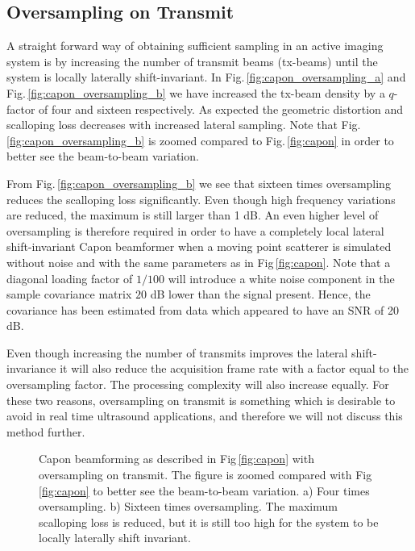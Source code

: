 \documentclass[draftcls]{IEEEtran}
\newcommand{\img}{img/}
\begin{document}
\subsection{Oversampling on Transmit}
A straight forward way of obtaining sufficient sampling in an active imaging system is by increasing the number of transmit beams (tx-beams) until the system is locally laterally shift-invariant. In Fig.\,\ref{fig:capon_oversampling_a} and Fig.\,\ref{fig:capon_oversampling_b} we have increased the tx-beam density by a $q$-factor of four and sixteen respectively. As expected the geometric distortion and scalloping loss decreases with increased lateral sampling. Note that Fig.\,\ref{fig:capon_oversampling_b} is zoomed compared to Fig.\,\ref{fig:capon} in order to better see the beam-to-beam variation.

From Fig.\,\ref{fig:capon_oversampling_b} we see that sixteen times oversampling reduces the scalloping loss significantly. Even though high frequency variations are reduced, the maximum is still larger than 1 dB. An even higher level of oversampling is therefore required in order to have a completely local lateral shift-invariant Capon beamformer when a moving point scatterer is simulated without noise and with the same parameters as in Fig\,\ref{fig:capon}. %
Note that a diagonal loading factor of $1/100$ will introduce a white noise component in the sample covariance matrix $20$ dB lower than the signal present. Hence, the covariance has been estimated from data which appeared to have an SNR of 20 dB.

Even though increasing the number of transmits improves the lateral shift-invariance it will also reduce the acquisition frame rate with a factor equal to the oversampling factor. The processing complexity will also increase equally. For these two reasons, oversampling on transmit is something which is desirable to avoid in real time ultrasound applications, and therefore we will not discuss this method further.

\begin{figure*}[!t]
\centerline{
}
\caption{Capon beamforming as described in Fig\,\ref{fig:capon} with oversampling on transmit. The figure is zoomed compared with Fig\,\ref{fig:capon} to better see the beam-to-beam variation. a) Four times oversampling. b) Sixteen times oversampling. The maximum scalloping loss is reduced, but it is still too high for the system to be locally laterally shift invariant.}
\label{fig:capon_oversampling}
\end{figure*}
\end{document}
